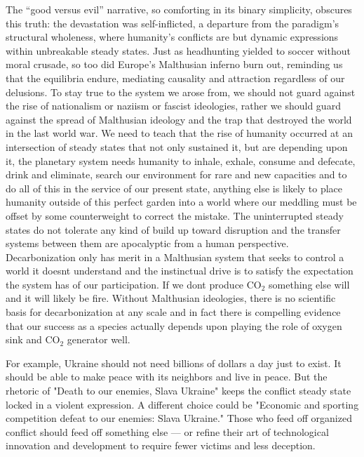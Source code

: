 The “good versus evil” narrative, so comforting in its binary simplicity, obscures this truth: the devastation was self-inflicted, a departure from the paradigm’s structural wholeness, where humanity’s conflicts are but dynamic expressions within unbreakable steady states. Just as headhunting yielded to soccer without moral crusade, so too did Europe’s Malthusian inferno burn out, reminding us that the equilibria endure, mediating causality and attraction regardless of our delusions. To stay true to the system we arose from, we should not guard against the rise of nationalism or naziism or fascist ideologies, rather we should guard against the spread of Malthusian ideology and the trap that destroyed the world in the last world war. We need to teach that the rise of humanity occurred at an intersection of steady states that not only sustained it, but are depending upon it, the planetary system needs humanity to inhale, exhale, consume and defecate, drink and eliminate, search our environment for rare and new capacities and to do all of this in the service of our present state, anything else is likely to place humanity outside of this perfect garden into a world where our meddling must be offset by some counterweight to correct the mistake. The uninterrupted steady states do not tolerate any kind of build up toward disruption and the transfer systems between them are apocalyptic from a human perspective. Decarbonization only has merit in a Malthusian system that seeks to control a world it doesnt understand and the instinctual drive is to satisfy the expectation the system has of our participation. If we dont produce CO$_2$ something else will and it will likely be fire. Without Malthusian ideologies, there is no scientific basis for decarbonization at any scale and in fact there is compelling evidence that our success as a species actually depends upon playing the role of oxygen sink and CO$_2$ generator well.

For example, Ukraine should not need billions of dollars a day just to exist. It should be able to make peace with its neighbors and live in peace. But the rhetoric of "Death to our enemies, Slava Ukraine" keeps the conflict steady state locked in a violent expression. A different choice could be "Economic and sporting competition defeat to our enemies: Slava Ukraine." Those who feed off organized conflict should feed off something else — or refine their art of technological innovation and development to require fewer victims and less deception.

